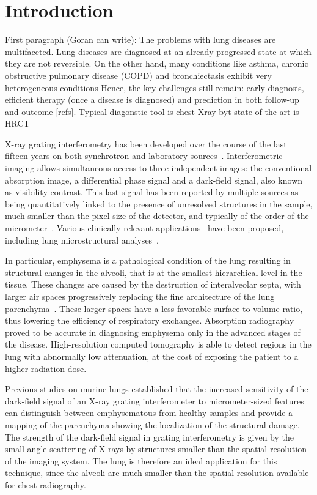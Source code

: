 \section{Introduction}\label{sec:introduction}
First paragraph (Goran can write): The problems with lung diseases are multifaceted. Lung diseases are diagnosed at an already progressed state at which they are not reversible. On the other hand, many conditions like asthma, chronic obstructive pulmonary disease (COPD) and bronchiectasis exhibit very heterogeneous conditions Hence, the key challenges still remain: early diagnosis, efficient therapy (once a disease is diagnosed) and prediction in both follow-up and outcome [refs]. Typical diagonstic tool is chest-Xray byt state of the art is HRCT

X-ray grating interferometry has been developed over the course of the last
  fifteen years on both synchrotron and laboratory
sources~\cite{David_2002,1347-4065-42-7B-L866,Weitkamp_2005,1347-4065-45-6R-5254,Pfeiffer2006}. Interferometric
imaging allows simultaneous access to three independent images: the
conventional absorption image, a differential phase signal and a dark-field
signal, also known as visibility contrast. This last signal has been
reported by multiple sources as being quantitatively linked to the presence
of unresolved structures in the sample, much smaller than the pixel size of
the detector, and typically of the order of the
micrometer~\cite{Pfeiffer2008,Lynch:11,Yashiro:10}.
Various clinically relevant
applications~\cite{Wen_2009,Thilo2013} have been
proposed, including lung microstructural analyses~\cite{Schleede17880,Meinel_2014,Meinel_2013,Yaroshenko_2013}.

In particular, emphysema is a pathological condition of the lung
resulting in structural changes in the alveoli, that is at the smallest
hierarchical level in the tissue. These changes are caused by the
destruction of interalveolar septa, with larger air spaces progressively
replacing the fine architecture of the lung parenchyma~\cite{Sharafkhaneh_2008}. These larger spaces
have a less favorable surface-to-volume ratio, thus lowering the efficiency
of respiratory exchanges. Absorption radiography proved to be accurate in
diagnosing emphysema only in the advanced stages of the disease. 
High-resolution computed tomography is able to detect regions in the lung
with abnormally low attenuation, at the cost of exposing the patient
to a higher radiation dose.

Previous studies on murine lungs established that the increased sensitivity of
the dark-field signal of an X-ray grating interferometer to micrometer-sized
features can distinguish between emphysematous from healthy samples and
provide a mapping of the parenchyma showing the localization of the
structural damage.
The strength of the dark-field signal in grating interferometry is
given by the small-angle scattering of X-rays by structures smaller than the
spatial resolution of the imaging system. The lung is therefore an ideal
application for this technique, since the alveoli are much
smaller than the spatial resolution available for chest radiography.

